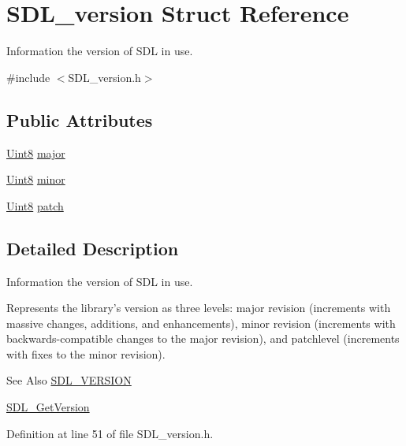 \hypertarget{struct_s_d_l__version}{\section{S\-D\-L\-\_\-version Struct Reference}
\label{struct_s_d_l__version}
}


Information the version of S\-D\-L in use.  




{\ttfamily \#include $<$S\-D\-L\-\_\-version.\-h$>$}

\subsection*{Public Attributes}
\begin{DoxyCompactItemize}
\item 
\hyperlink{_s_d_l__stdinc_8h_a2944638813a090aa23e62f4da842c3e2}{Uint8} \hyperlink{struct_s_d_l__version_ad7d7674532073eed237b90f546c97cd0}{major}
\item 
\hyperlink{_s_d_l__stdinc_8h_a2944638813a090aa23e62f4da842c3e2}{Uint8} \hyperlink{struct_s_d_l__version_a6c35c7bf80245028d5970e6a504ecf57}{minor}
\item 
\hyperlink{_s_d_l__stdinc_8h_a2944638813a090aa23e62f4da842c3e2}{Uint8} \hyperlink{struct_s_d_l__version_aa6dacff18edee8cd037c773b843be0f1}{patch}
\end{DoxyCompactItemize}


\subsection{Detailed Description}
Information the version of S\-D\-L in use. 

Represents the library's version as three levels\-: major revision (increments with massive changes, additions, and enhancements), minor revision (increments with backwards-\/compatible changes to the major revision), and patchlevel (increments with fixes to the minor revision).

\begin{DoxySeeAlso}{See Also}
\hyperlink{_s_d_l__version_8h_a7154bc5c2a95a644b5187e4225cdcbd0}{S\-D\-L\-\_\-\-V\-E\-R\-S\-I\-O\-N} 

\hyperlink{_s_d_l__version_8h_a4204ecbb600f51ee50515979e60bf8f3}{S\-D\-L\-\_\-\-Get\-Version} 
\end{DoxySeeAlso}


Definition at line 51 of file S\-D\-L\-\_\-version.\-h.



